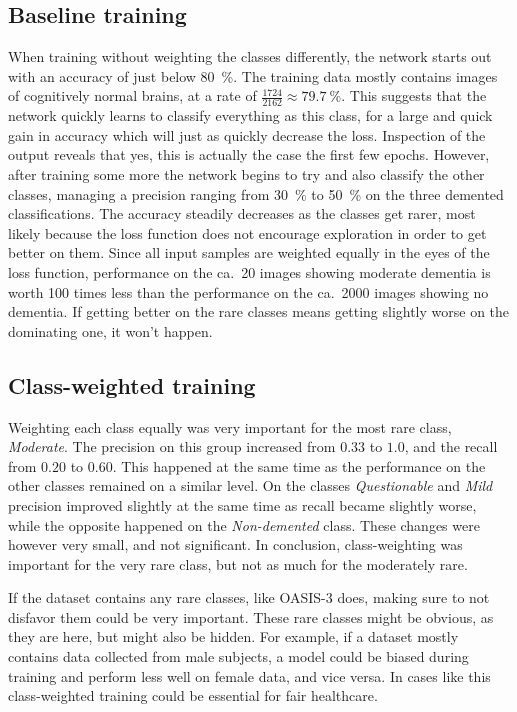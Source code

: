 \documentclass{kththesis}
\newcommand{\num}[1]{{#1}}
\begin{document}
\subsection{Baseline training}
When training without weighting the classes differently, the network starts out with an accuracy of just below 80~\%. The training data mostly contains images of cognitively normal brains, at a rate of $\frac{1724}{2162} \approx 79.7~\%$. This suggests that the network quickly learns to classify everything as this class, for a large and quick gain in accuracy which will just as quickly decrease the loss. Inspection of the output reveals that yes, this is actually the case the first few epochs. However, after training some more the network begins to try and also classify the other classes, managing a precision ranging from 30~\% to 50~\% on the three demented classifications. The accuracy steadily decreases as the classes get rarer, most likely because the loss function does not encourage exploration in order to get better on them. Since all input samples are weighted equally in the eyes of the loss function, performance on the ca.\ 20 images showing moderate dementia is worth 100 times less than the performance on the ca.\ \num{2000} images showing no dementia. If getting better on the rare classes means getting slightly worse on the dominating one, it won't happen.

\subsection{Class-weighted training}
Weighting each class equally was very important for the most rare class, \textit{Moderate}. The precision on this group increased from $0.33$ to $1.0$, and the recall from $0.20$ to $0.60$. This happened at the same time as the performance on the other classes remained on a similar level. On the classes \textit{Questionable} and \textit{Mild} precision improved slightly at the same time as recall became slightly worse, while the opposite happened on the \textit{Non-demented} class. These changes were however very small, and not significant. In conclusion, class-weighting was important for the very rare class, but not as much for the moderately rare.

If the dataset contains any rare classes, like OASIS-3 does, making sure to not disfavor them could be very important. These rare classes might be obvious, as they are here, but might also be hidden. For example, if a dataset mostly contains data collected from male subjects, a model could be biased during training and perform less well on female data, and vice versa. In cases like this 
class-weighted training could be essential for fair healthcare.
\end{document}

